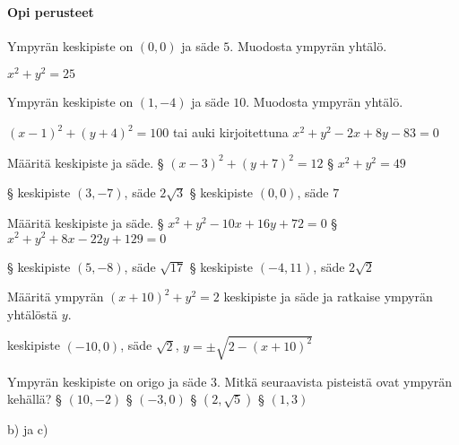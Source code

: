\begin{tehtavasivu}

\paragraph*{Opi perusteet}

\begin{tehtava}
	Ympyrän keskipiste on $(0, 0)$ ja säde $5$. Muodosta ympyrän yhtälö.
	\begin{vastaus}
		$x^2+y^2=25$
	\end{vastaus}
\end{tehtava}

\begin{tehtava}
	Ympyrän keskipiste on $(1, -4)$ ja säde $10$. Muodosta ympyrän yhtälö.
	\begin{vastaus}
		$(x-1)^2+(y+4)^2=100$ tai auki kirjoitettuna $x^2+y^2-2x+8y-83=0$ %
	\end{vastaus}
\end{tehtava}

\begin{tehtava}
	Määritä keskipiste ja säde.
	\alakohdat
		§ $(x-3)^2+(y+7)^2=12$
		§ $x^2+y^2=49$
	\loppu
	\begin{vastaus}
		\alakohdat
			§ keskipiste $(3, -7)$, säde $2\sqrt{3}$
			§ keskipiste $(0, 0)$, säde $7$
		\loppu
	\end{vastaus}
\end{tehtava}

\begin{tehtava}
	Määritä keskipiste ja säde.
	\alakohdat
		§ $x^2+y^2-10x+16y+72=0$
		§ $x^2+y^2+8x-22y+129=0$
	\loppu
	\begin{vastaus}
		\alakohdat
			§ keskipiste $(5, -8)$, säde $\sqrt{17}$
			§ keskipiste $(-4, 11)$, säde $2\sqrt{2}$
		\loppu
	\end{vastaus}
\end{tehtava}

\begin{tehtava}
	Määritä ympyrän $(x+10)^2+y^2=2$ keskipiste ja säde ja ratkaise ympyrän yhtälöstä $y$. 
	\begin{vastaus}
		keskipiste $(-10, 0)$, säde $\sqrt{2}$, $y=\pm\sqrt{2-(x+10)^2}$ 
	\end{vastaus}
\end{tehtava}

\begin{tehtava}
	Ympyrän keskipiste on origo ja säde $3$. Mitkä seuraavista pisteistä ovat ympyrän kehällä?
	\alakohdat
		§ $(10, -2)$
		§ $(-3, 0)$
		§ $(2, \sqrt{5})$
		§ $(1, 3)$
	\loppu
	\begin{vastaus}
		b) ja c)
	\end{vastaus}
\end{tehtava}


\end{tehtavasivu}
